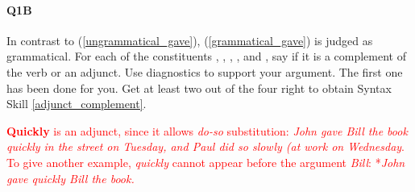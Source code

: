 \documentclass{article}
\begin{document}




\paragraph{Q1B} In contrast to (\ref{ungrammatical_gave}), (\ref{grammatical_gave}) is judged as grammatical.
For each of the constituents , , , , and , say if it is a complement of the verb or an adjunct. Use diagnostics to support your argument. The first one has been done for you. Get at least two out of the four right to obtain Syntax Skill \ref{adjunct_complement}.
\begin{exe}
    \label{grammatical_gave}
\end{exe}

\textcolor{red}{\textbf{Quickly} is an adjunct, since it allows \emph{do-so} substitution: \emph{John gave Bill the book quickly in the street on Tuesday, and Paul did so slowly (at work on Wednesday}. To give another example, \emph{quickly} cannot appear before the argument \emph{Bill}: *\emph{John gave quickly Bill the book.}}
\end{document}
